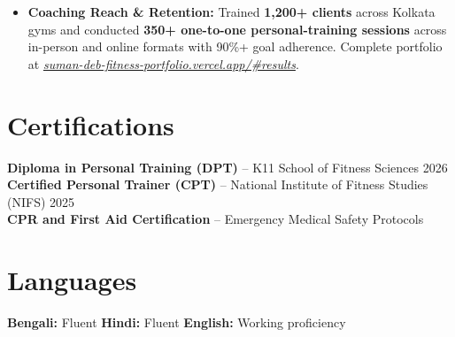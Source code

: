 \documentclass[10pt,a4paper]{article}
\begin{document}
\begin{itemize}
    \item \textbf{Coaching Reach \& Retention:} Trained \textbf{1,200+ clients} across Kolkata gyms and conducted \textbf{350+ one-to-one personal-training sessions} across in-person and online formats with 90\%+ goal adherence. Complete portfolio at \href{https://suman-deb-fitness-portfolio.vercel.app/\#results}{\textit{suman-deb-fitness-portfolio.vercel.app/\#results}}.
\end{itemize}

\section{Certifications}

\textbf{Diploma in Personal Training (DPT)} -- K11 School of Fitness Sciences \hfill 2026\\
\textbf{Certified Personal Trainer (CPT)} -- National Institute of Fitness Studies (NIFS) \hfill 2025\\
\textbf{CPR and First Aid Certification} -- Emergency Medical Safety Protocols

\section{Languages}

\textbf{Bengali:} Fluent \qquad
\textbf{Hindi:} Fluent \qquad
\textbf{English:} Working proficiency
\end{document}
